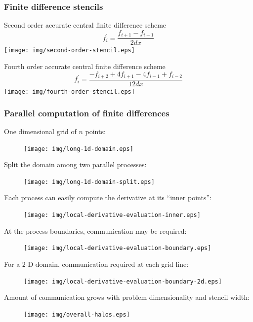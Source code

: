 \documentclass[10pt]{beamer}
\begin{document}
\begin{frame}[t]
\frametitle{Finite difference stencils}
\footnotesize

\begin{block}
{Second order accurate central finite difference scheme} 
\begin{equation*}
    f_i^\prime = \frac{f_{i+1} - f_{i-1}}{2dx}
\end{equation*}
\centering
\texttt{[image: img/second-order-stencil.eps]}
\end{block}

\begin{block}
{Fourth order accurate central finite difference scheme}
\begin{equation*}
    f_i^\prime = \frac{-f_{i+2} + 4f_{i+1} - 4f_{i-1} +f_{i-2}}{12dx}
\end{equation*}
\centering
\texttt{[image: img/fourth-order-stencil.eps]}
\end{block}
\end{frame}

\begin{frame}

\end{frame}


\begin{frame}
\frametitle{Parallel computation of finite differences}
 {
    One dimensional grid of $n$ points:
    \begin{figure}
    \centering
    \texttt{[image: img/long-1d-domain.eps]}
    \end{figure}
}
 {
    Split the domain among two parallel processes:
    \begin{figure}
    \centering
    \texttt{[image: img/long-1d-domain-split.eps]}
    \end{figure}
}
 {
    Each process can easily compute the derivative at its ``inner points'':
    \begin{figure}
    \centering
    \texttt{[image: img/local-derivative-evaluation-inner.eps]}
    \end{figure}
}
 {
    At the process boundaries, communication may be required:
    \begin{figure}
    \centering
    \texttt{[image: img/local-derivative-evaluation-boundary.eps]}
    \end{figure}
}
 {
    For a 2-D domain, communication required at each grid line:
    \begin{figure}
    \centering
    \texttt{[image: img/local-derivative-evaluation-boundary-2d.eps]}
    \end{figure}
}
 {
    Amount of communication grows with problem dimensionality and stencil width:
    \begin{figure}
    \centering
    \texttt{[image: img/overall-halos.eps]}
    \end{figure}
}
\end{frame}
\end{document}

